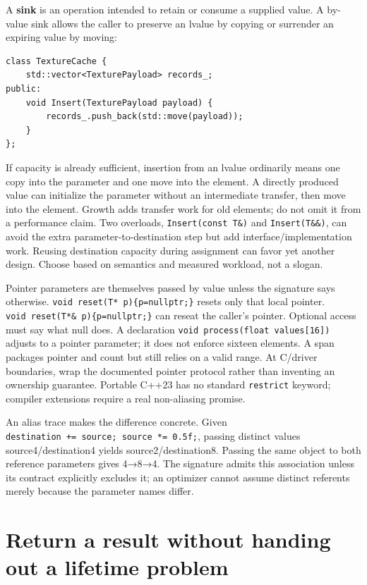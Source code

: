 A \textbf{sink} is an operation intended to retain or consume a supplied value. A by-value sink allows the caller to preserve an lvalue by copying or surrender an expiring value by moving:

\begin{verbatim}
class TextureCache {
    std::vector<TexturePayload> records_;
public:
    void Insert(TexturePayload payload) {
        records_.push_back(std::move(payload));
    }
};
\end{verbatim}

If capacity is already sufficient, insertion from an lvalue ordinarily means one copy into the parameter and one move into the element. A directly produced value can initialize the parameter without an intermediate transfer, then move into the element. Growth adds transfer work for old elements; do not omit it from a performance claim. Two overloads, \texttt{Insert(const\ T\&)} and \texttt{Insert(T\&\&)}, can avoid the extra parameter-to-destination step but add interface/implementation work. Reusing destination capacity during assignment can favor yet another design. Choose based on semantics and measured workload, not a slogan.

Pointer parameters are themselves passed by value unless the signature says otherwise. \texttt{void\ reset(T*\ p)\{p=nullptr;\}} resets only that local pointer. \texttt{void\ reset(T*\&\ p)\{p=nullptr;\}} can reseat the caller's pointer. Optional access must say what null does. A declaration \texttt{void\ process(float\ values{[}16{]})} adjusts to a pointer parameter; it does not enforce sixteen elements. A span packages pointer and count but still relies on a valid range. At C/driver boundaries, wrap the documented pointer protocol rather than inventing an ownership guarantee. Portable C++23 has no standard \texttt{restrict} keyword; compiler extensions require a real non-aliasing promise.

An alias trace makes the difference concrete. Given \texttt{destination\ +=\ source;\ source\ *=\ 0.5f;}, passing distinct values source4/destination4 yields source2/destination8. Passing the same object to both reference parameters gives 4→8→4. The signature admits this association unless its contract explicitly excludes it; an optimizer cannot assume distinct referents merely because the parameter names differ.

\section{Return a result without handing out a lifetime problem}\label{05-engine-i-ch003-return-a-result-without-handing-out-a-lifetime-problem}

